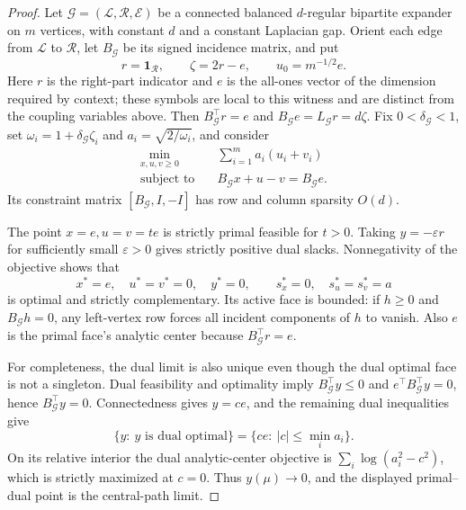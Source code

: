 \begin{proof}
Let $\mathcal G=(\mathcal L,\mathcal R,\mathcal E)$ be a connected balanced
$d$-regular bipartite expander on $m$ vertices, with constant $d$ and a
constant Laplacian gap.  Orient each edge from $\mathcal L$ to $\mathcal R$,
let $B_{\mathcal G}$ be its signed incidence matrix, and put
\[
 r=\mathbf1_{\mathcal R},\qquad \zeta=2r-e,\qquad
 u_0=m^{-1/2}e.
\]
Here $r$ is the right-part indicator and $e$ is the all-ones vector of the
dimension required by context; these symbols are local to this witness and
are distinct from the coupling variables above.  Then
$B_{\mathcal G}^\top r=e$ and
$B_{\mathcal G}e=L_{\mathcal G}r=d\zeta$.  Fix
$0<\delta_{\mathcal G}<1$, set
$\omega_i=1+\delta_{\mathcal G}\zeta_i$ and
$a_i=\sqrt{2/\omega_i}$, and consider
\begin{equation}
 \begin{aligned}
 \min_{x,u,v\geq0}\quad&\sum_{i=1}^m a_i(u_i+v_i)\\
 \text{subject to}\quad&B_{\mathcal G}x+u-v=B_{\mathcal G}e.
 \end{aligned}
 \label{eq:expander-lp}
\end{equation}
Its constraint matrix $[B_{\mathcal G},I,-I]$ has row and column sparsity
$O(d)$.

The point $x=e,u=v=te$ is strictly primal feasible for $t>0$.  Taking
$y=-\varepsilon r$ for sufficiently small $\varepsilon>0$
gives strictly positive dual slacks.  Nonnegativity of the objective shows
that
\[
 x^*=e,\quad u^*=v^*=0,\quad y^*=0,
 \qquad s_x^*=0,\quad s_u^*=s_v^*=a
\]
is optimal and strictly complementary.  Its active face is bounded: if
$h\geq0$ and $B_{\mathcal G}h=0$, any left-vertex row forces all incident
components of $h$ to vanish.  Also $e$ is the primal face's analytic center
because $B_{\mathcal G}^\top r=e$.

For completeness, the dual limit is also unique even though the dual optimal
face is not a singleton.  Dual feasibility and optimality imply
$B_{\mathcal G}^\top y\leq0$ and
$e^\top B_{\mathcal G}^\top y=0$, hence
$B_{\mathcal G}^\top y=0$.  Connectedness gives $y=ce$, and the remaining
dual inequalities give
\[
 \{y:\ y\text{ is dual optimal}\}
 =\{ce:\ |c|\leq\min_i a_i\}.
\]
On its relative interior the dual analytic-center objective is
$\sum_i\log(a_i^2-c^2)$, which is strictly maximized at $c=0$.  Thus
$y(\mu)\to0$, and the displayed primal--dual point is the central-path
limit.


\end{proof}
